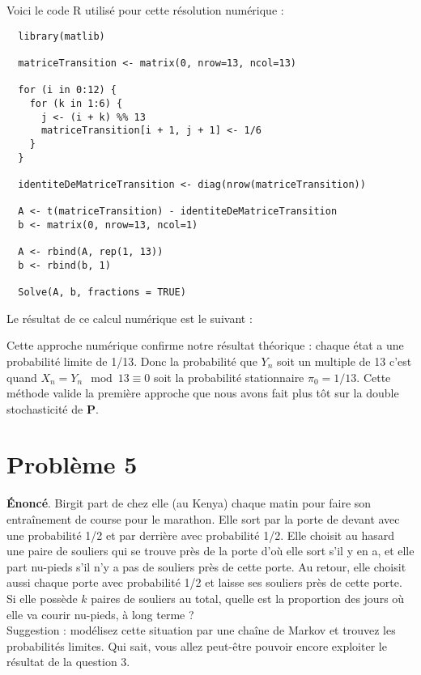 \documentclass{article}
\begin{document}
    Voici le code R utilisé pour cette résolution numérique :
    \begin{verbatim}
  library(matlib)

  matriceTransition <- matrix(0, nrow=13, ncol=13)

  for (i in 0:12) {
    for (k in 1:6) {
      j <- (i + k) %% 13
      matriceTransition[i + 1, j + 1] <- 1/6
    }
  }

  identiteDeMatriceTransition <- diag(nrow(matriceTransition))

  A <- t(matriceTransition) - identiteDeMatriceTransition
  b <- matrix(0, nrow=13, ncol=1) 

  A <- rbind(A, rep(1, 13))
  b <- rbind(b, 1)

  Solve(A, b, fractions = TRUE)
    \end{verbatim}

    Le résultat de ce calcul numérique est le suivant :

    \vspace{.2cm}
    Cette approche numérique confirme notre résultat théorique : chaque état a une probabilité limite de 1/13. Donc la probabilité que $Y_n$ soit un multiple de 13 c'est quand \(X_n = Y_n \mod 13 \equiv 0\) soit la probabilité stationnaire $\pi_0 = 1/13$. Cette méthode valide la première approche que nous avons fait plus tôt sur la double stochasticité de $\boldsymbol{P}$.

\section*{Problème 5}
    \textbf{Énoncé}. Birgit part de chez elle (au Kenya) chaque matin pour faire son entraînement de course pour le marathon. Elle sort par la porte de devant avec une probabilité 1/2 et par derrière avec probabilité 1/2. Elle choisit au hasard une paire de souliers qui se trouve près de la porte d'où elle sort s'il y en a, et elle part nu-pieds s'il n'y a pas de souliers près de cette porte. Au retour, elle choisit aussi chaque porte avec probabilité 1/2 et laisse ses souliers près de cette porte. Si elle possède $k$ paires de souliers au total, quelle est la proportion des jours où elle va courir nu-pieds, à long terme ? \\

    \noindent Suggestion : modélisez cette situation par une chaîne de Markov et trouvez les probabilités limites. Qui sait, vous allez peut-être pouvoir encore exploiter le résultat de la question 3.
\end{document}

